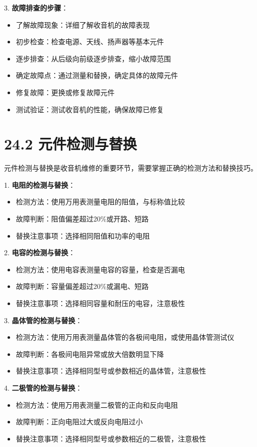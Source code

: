 \documentclass[12pt,UTF8]{ctexbook}
\begin{document}
3. \textbf{故障排查的步骤}：
   \begin{itemize}[leftmargin=3.5em]
   \item 了解故障现象：详细了解收音机的故障表现
   \item 初步检查：检查电源、天线、扬声器等基本元件
   \item 逐步排查：从后级向前级逐步排查，缩小故障范围
   \item 确定故障点：通过测量和替换，确定具体的故障元件
   \item 修复故障：更换或修复故障元件
   \item 测试验证：测试收音机的性能，确保故障已修复
   \end{itemize}

\section*{24.2 元件检测与替换}

元件检测与替换是收音机维修的重要环节，需要掌握正确的检测方法和替换技巧。

1. \textbf{电阻的检测与替换}：
   \begin{itemize}[leftmargin=3.5em]
   \item 检测方法：使用万用表测量电阻的阻值，与标称值比较
   \item 故障判断：阻值偏差超过20\%或开路、短路
   \item 替换注意事项：选择相同阻值和功率的电阻
   \end{itemize}

2. \textbf{电容的检测与替换}：
   \begin{itemize}[leftmargin=3.5em]
   \item 检测方法：使用电容表测量电容的容量，检查是否漏电
   \item 故障判断：容量偏差超过20\%或漏电、短路
   \item 替换注意事项：选择相同容量和耐压的电容，注意极性
   \end{itemize}

3. \textbf{晶体管的检测与替换}：
   \begin{itemize}[leftmargin=3.5em]
   \item 检测方法：使用万用表测量晶体管的各极间电阻，或使用晶体管测试仪
   \item 故障判断：各极间电阻异常或放大倍数明显下降
   \item 替换注意事项：选择相同型号或参数相近的晶体管，注意极性
   \end{itemize}

4. \textbf{二极管的检测与替换}：
   \begin{itemize}[leftmargin=3.5em]
   \item 检测方法：使用万用表测量二极管的正向和反向电阻
   \item 故障判断：正向电阻过大或反向电阻过小
   \item 替换注意事项：选择相同型号或参数相近的二极管，注意极性
   \end{itemize}
\end{document}
